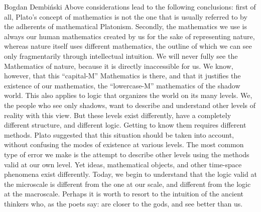\begin{artengenv}{Bogdan Dembiński}
Above considerations lead to the following conclusions: first of all, Plato’s concept of mathematics is not the one that
is usually referred to by the adherents of mathematical Platonism. Secondly, the mathematics we use is always our human
mathematics created by us for the sake of representing nature, whereas nature itself uses different mathematics, the
outline of which we can see only fragmentarily through intellectual intuition. We will never fully see the Mathematics
of nature, because it is directly inaccessible for us. We know, however, that this ``capital-M'' Mathematics is there,
and that it justifies the existence of our mathematics, the ``lowercase-M'' mathematics of the shadow world. This also
applies to logic that organizes the world on its many levels. We, the people who see only shadows, want to describe and
understand other levels of reality with this view. But these levels exist differently, have a completely different
structure, and different logic. Getting to know them requires different methods. Plato suggested that this situation
should be taken into account, without confusing the %
modes of existence at various levels. The most common type of error we make is the attempt to describe other levels
using the methods valid at our own level.  Yet ideas, mathematical objects, and other time-space phenomena %
exist differently. %
Today, we begin to understand that the logic valid at the microscale is different from the one at our scale, and
different from the logic at the macroscale. Perhaps it is worth to resort to the intuition of the ancient thinkers who,
as the poets say: are closer to the gods, and see better than us. 




\end{artengenv}
